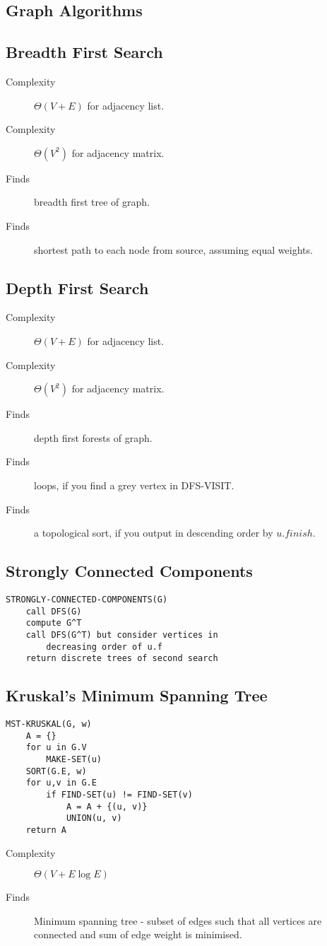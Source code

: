 \documentclass[landscape]{cheat}
\begin{document}
\begin{multicols*}{3}
\section{Graph Algorithms}

\subsection{Breadth First Search}
\begin{description}
    \item[Complexity] $\Theta(V+E)$ for adjacency list.
    \item[Complexity] $\Theta(V^2)$ for adjacency matrix.
    \item[Finds] breadth first tree of graph.
    \item[Finds] shortest path to each node from source, assuming equal weights.
\end{description}

\subsection{Depth First Search}
\begin{description}
    \item[Complexity] $\Theta(V+E)$ for adjacency list.
    \item[Complexity] $\Theta(V^2)$ for adjacency matrix.
    \item[Finds] depth first forests of graph.
    \item[Finds] loops, if you find a grey vertex in DFS-VISIT.
    \item[Finds] a topological sort, if you output in descending order by $u.finish$.
\end{description}

\subsection{Strongly Connected Components}
\begin{lstlisting}
STRONGLY-CONNECTED-COMPONENTS(G)
    call DFS(G)
    compute G^T
    call DFS(G^T) but consider vertices in
        decreasing order of u.f
    return discrete trees of second search
\end{lstlisting}

\subsection{Kruskal's Minimum Spanning Tree}
\begin{lstlisting}
MST-KRUSKAL(G, w)
    A = {}
    for u in G.V
        MAKE-SET(u)
    SORT(G.E, w)
    for u,v in G.E
        if FIND-SET(u) != FIND-SET(v)
            A = A + {(u, v)}
            UNION(u, v)
    return A
\end{lstlisting}
\begin{description}
    \item[Complexity] $\Theta(V+E\log{E})$
    \item[Finds] Minimum spanning tree - subset of edges such that all vertices are connected and sum of edge weight is minimised.
\end{description}


\end{multicols*}
\end{document}
